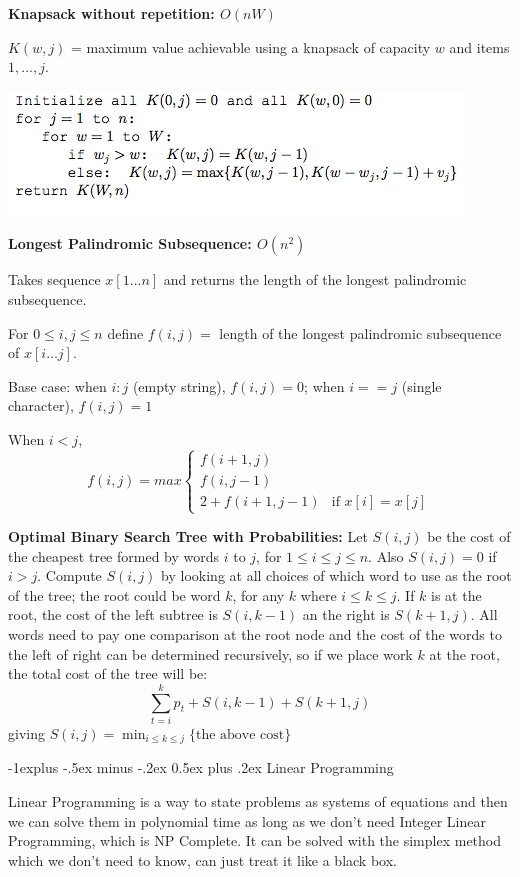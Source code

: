 \documentclass[landscape]{article}
\makeatletter
\renewcommand{\subsection}{\@startsection{subsection}{2}{0mm}%
                            {-1explus -.5ex minus -.2ex}%
                            {0.5ex plus .2ex}%
                            {\normalfont\normalsize\bfseries}}
\makeatother
\begin{document}
\begin{multicols}{3}
\textbf{Knapsack without repetition: $O(nW)$}

$K(w, j)$ = maximum value achievable using a knapsack of capacity $w$ and items $1, . . . , j$.

\includegraphics[scale=0.5]{knapWR}

\textbf{Longest Palindromic Subsequence: $O(n^2)$}

Takes sequence $x[1\ldots n]$ and returns the length of the longest palindromic subsequence.

For $0\leq i,j\leq n$ define $f(i,j)=$ length of the longest palindromic subsequence of $x[i\ldots j]$.  

Base case: when $i:j$ (empty string), $ f(i,j) = 0$; when $i == j$ (single character), $f(i,j) = 1$

When $i<j$, 
\[
 f(i,j) = max
  \begin{cases}
   f(i+1,j) \\
   f(i,j-1)\\
   2+f(i+1,j-1) & \text{if } x [i] = x[j]
  \end{cases}
\]

\textbf{Optimal Binary Search Tree with Probabilities:}
Let $S(i,j)$ be the cost of the cheapest tree formed by words $i$ to $j$, for $1\leq i \leq j \leq n$. Also $S(i,j) = 0$ if $i>j$.  Compute $S(i,j)$ by looking at all choices of which word to use as the root of the tree; the root could be word $k$, for any $k$ where $i\leq k \leq j$.  If $k$ is at the root, the cost of the left subtree is $S(i,k-1)$ an the right is $S(k+1, j)$.  All words need to pay one comparison at the root node and the cost of the words to the left of right can be determined recursively, so if we place work $k$ at the root, the total cost of the tree will be:
$$ \sum^k_{t=i} p_t + S(i,k-1) + S(k+1, j)$$
giving $S(i,j) = \min_{i\leq k \leq j}\{\text{the above cost}\}$

\subsection{Linear Programming}

Linear Programming is a way to state problems as systems of equations and then we can solve them in polynomial time as long as we don't need Integer Linear Programming, which is NP Complete.
It can be solved with the simplex method which we don't need to know, can just treat it like a black box.


\end{multicols}
\end{document}

